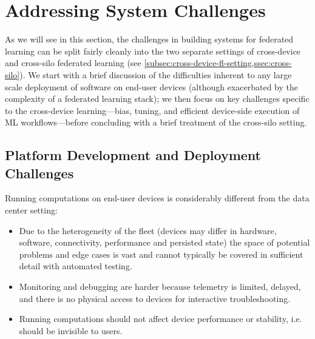 \documentclass[11pt]{article}
\begin{document}

\pagebreak
\section{Addressing System Challenges}
As we will see in this section, the challenges in building systems for federated learning can be split fairly cleanly into the two separate settings of cross-device and cross-silo federated learning (see \cref{subsec:cross-device-fl-setting,ssec:cross-silo}). We start with a brief discussion of the difficulties inherent to any large scale deployment of software on end-user devices (although exacerbated by the complexity of a federated learning stack); we then focus on key challenges specific to the cross-device learning---bias, tuning, and efficient device-side execution of ML workflows---before concluding with a brief treatment of the cross-silo setting.

\subsection{Platform Development and Deployment Challenges}
\label{subsec:systems-platform-development-and-deployment-challenges}

Running computations on end-user devices is considerably different from the data center setting:
\begin{itemize}
    \item Due to the heterogeneity of the fleet (devices may differ in hardware, software, connectivity, performance and persisted state) the space of potential problems and edge cases is vast and cannot typically be covered in sufficient detail with automated testing.
    \item Monitoring and debugging are harder because telemetry is limited, delayed, and there is no physical access to devices for interactive troubleshooting.
    \item Running computations should not affect device performance or stability, i.e. should be invisible to users.
\end{itemize}
\end{document}
